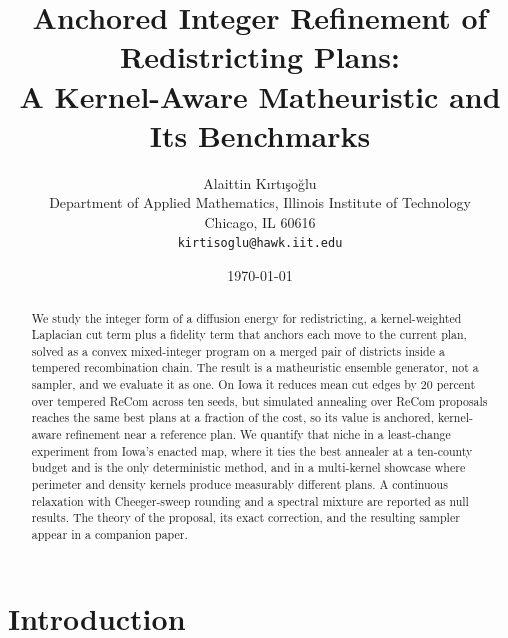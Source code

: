 \documentclass[11pt]{article}
\title{Anchored Integer Refinement of Redistricting Plans:\\
       A Kernel-Aware Matheuristic and Its Benchmarks}
\author{Alaittin K\i rt\i \c{s}o\u{g}lu \\
        \small Department of Applied Mathematics, Illinois Institute of Technology \\
        \small Chicago, IL 60616 \\
        \small \texttt{kirtisoglu@hawk.iit.edu}}
\date{\today}
\begin{document}
\maketitle

\begin{abstract}
We study the integer form of a diffusion energy for redistricting, a
kernel-weighted Laplacian cut term plus a fidelity term that anchors
each move to the current plan, solved as a convex mixed-integer
program on a merged pair of districts inside a tempered recombination
chain. The result is a matheuristic ensemble generator, not a
sampler, and we evaluate it as one. On Iowa it reduces mean cut edges
by 20 percent over tempered ReCom across ten seeds, but simulated
annealing over ReCom proposals reaches the same best plans at a
fraction of the cost, so its value is anchored, kernel-aware
refinement near a reference plan. We quantify that niche in a
least-change experiment from Iowa's enacted map, where it ties the
best annealer at a ten-county budget and is the only deterministic
method, and in a multi-kernel showcase where perimeter and density
kernels produce measurably different plans. A continuous relaxation
with Cheeger-sweep rounding and a spectral mixture are reported as
null results. The theory of the proposal, its exact correction, and
the resulting sampler appear in a companion paper.
\end{abstract}


\section{Introduction}\label{sec:intro}

\end{document}

